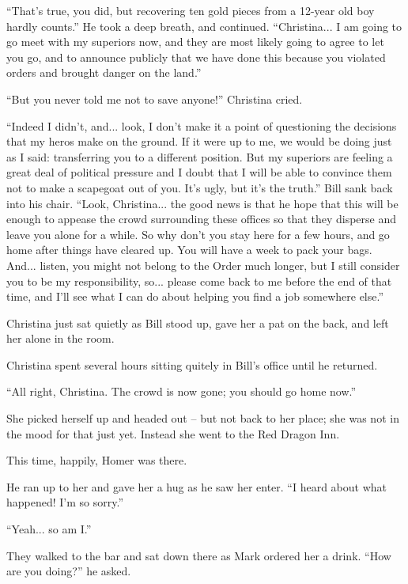 \documentclass[showtrims,b6paper,draft,10pt]{memoir}
\begin{document}
``That's true, you did, but recovering ten gold pieces from a 12-year old boy hardly counts.''  He took a deep breath, and continued.  ``Christina... I am going to go meet with my superiors now, and they are most likely going to agree to let you go, and to announce publicly that we have done this because you violated orders and brought danger on the land.''

``But you never told me not to save anyone!''  Christina cried.

``Indeed I didn't, and... look, I don't make it a point of questioning the decisions that my heros make on the ground.  If it were up to me, we would be doing just as I said:  transferring you to a different position.  But my superiors are feeling a great deal of political pressure and I doubt that I will be able to convince them not to make a scapegoat out of you.  It's ugly, but it's the truth.''  Bill sank back into his chair.  ``Look, Christina... the good news is that he hope that this will be enough to appease the crowd surrounding these offices so that they disperse and leave you alone for a while.  So why don't you stay here for a few hours, and go home after things have cleared up.  You will have a week to pack your bags.  And...  listen, you might not belong to the Order much longer, but I still consider you to be my responsibility, so... please come back to me before the end of that time, and I'll see what I can do about helping you find a job somewhere else.''

Christina just sat quietly as Bill stood up, gave her a pat on the back, and left her alone in the room.

 \timeskip

Christina spent several hours sitting quitely in Bill's office until he returned.

``All right, Christina.  The crowd is now gone;  you should go home now.''

She picked herself up and headed out -- but not back to her place;  she was not in the mood for that just yet.  Instead she went to the Red Dragon Inn.

This time, happily, Homer was there.

He ran up to her and gave her a hug as he saw her enter.  ``I heard about what happened!  I'm so sorry.''

``Yeah... so am I.''

They walked to the bar and sat down there as Mark ordered her a drink.  ``How are you doing?''  he asked.
\end{document}
